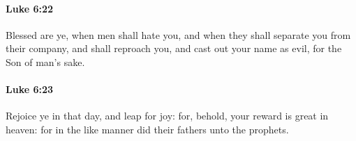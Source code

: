 		\paragraph{Luke 6:22} %
			\label{LUKE-6-22}

			Blessed are ye, when men shall hate you, and when they shall separate you from their company, and shall reproach you, and cast out your name as evil, for the Son of man's sake.

			\begin{framed}
			\scriptsize
				\begin{compactdesc}
					\item[SBLG] 
				\end{compactdesc}
			\end{framed}

		\paragraph{Luke 6:23} %
			\label{LUKE-6-23}

			Rejoice ye in that day, and leap for joy: for, behold, your reward is great in heaven: for in the like manner did their fathers unto the prophets.

